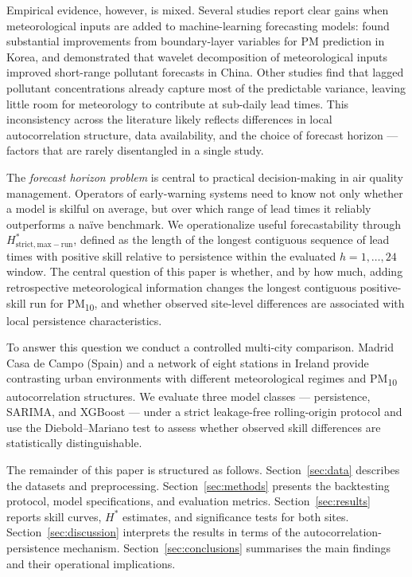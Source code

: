 \documentclass[12pt,a4paper]{article}
\newcommand{\PMten}{PM\textsubscript{10}}
\begin{document}
Empirical evidence, however, is mixed.  Several studies report clear gains
when meteorological inputs are added to machine-learning forecasting models:
\citet{Pak2018} found substantial improvements from boundary-layer variables
for PM prediction in Korea, and \citet{Bai2018} demonstrated that wavelet
decomposition of meteorological inputs improved short-range pollutant
forecasts in China.  Other studies find that lagged pollutant concentrations
already capture most of the predictable variance, leaving little room for
meteorology to contribute at sub-daily lead times.  This inconsistency across
the literature likely reflects differences in local autocorrelation structure,
data availability, and the choice of forecast horizon — factors that are
rarely disentangled in a single study.

The \emph{forecast horizon problem} is central to practical decision-making in
air quality management.  Operators of early-warning systems need to know not
only whether a model is skilful on average, but over which range of lead times
it reliably outperforms a naïve benchmark.  We operationalize useful
forecastability through $H^*_{\mathrm{strict,max-run}}$, defined as the length
of the longest contiguous sequence of lead times with positive skill relative to
persistence within the evaluated $h=1,\ldots,24$ window.  The central question
of this paper is whether, and by how much, adding retrospective meteorological
information changes the longest contiguous positive-skill run for \PMten{}, and
whether observed site-level differences are associated with local persistence
characteristics.

To answer this question we conduct a controlled multi-city comparison.
Madrid Casa de Campo (Spain) and a network of eight stations in Ireland provide
contrasting urban environments with different meteorological regimes and
\PMten{} autocorrelation structures.  We evaluate three model classes —
persistence, SARIMA, and XGBoost — under a strict leakage-free
rolling-origin protocol and use the Diebold--Mariano test
\citep{Diebold1995} to assess whether observed skill differences
are statistically distinguishable.

The remainder of this paper is structured as follows.  Section~\ref{sec:data}
describes the datasets and preprocessing.  Section~\ref{sec:methods} presents
the backtesting protocol, model specifications, and evaluation metrics.
Section~\ref{sec:results} reports skill curves, $H^*$ estimates, and
significance tests for both sites.  Section~\ref{sec:discussion} interprets
the results in terms of the autocorrelation-persistence mechanism.
Section~\ref{sec:conclusions} summarises the main findings and their
operational implications.
\end{document}
